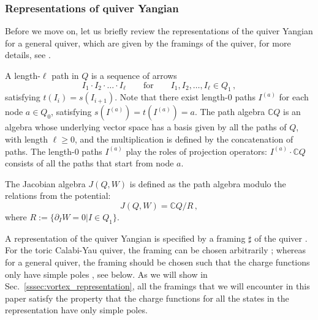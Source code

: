 \documentclass[12pt,a4paper]{article}
\newcounter{subsubsubsection}[subsubsection]
\renewcommand{\(}{\left(}
\renewcommand{\)}{\right)}
\renewcommand{\(}{\left(}
\renewcommand{\)}{\right)}
\begin{document}
\subsubsection{Representations of quiver Yangian}
\label{sssec:QY_rep}

Before we move on, let us briefly review the representations of the quiver Yangian for a general quiver, which are given by the framings of the quiver, for more details, 
see \cite{Li:2023zub}.


A length-$\ell$ path in $Q$ is a sequence of arrows
\begin{equation}\label{eq:path}
	I_1\cdot I_2\cdot\dots\cdot I_\ell\qquad \mathrm{for}\qquad  I_1,I_2,\dots,I_\ell\in Q_1\,,
\end{equation}
satisfying $t(I_i)=s(I_{i+1})$. 
Note that there exist length-$0$ paths $I^{(a)}$ for each node $a\in Q_0$, satisfying $s(I^{(a)})=t(I^{(a)})=a$.
The path algebra $\mathbb{C}Q$ is an algebra whose underlying vector space has a basis given by all the paths of $Q$, with length $\ell \geq 0$, and the multiplication is defined by the concatenation of paths. 
The length-$0$ paths $I^{(a)}$ play the roles of projection operators:  $I^{(a)}\cdot\mathbb{C}Q$ consists of all the paths that start from node $a$.

The Jacobian algebra $J(Q,W)$ is defined as the path algebra modulo the relations from the potential:
\begin{equation}
	J(Q,W)=\mathbb{C}Q/R\,,
\end{equation}
where $R:=\{\partial_I W=0| I\in Q_1\}$.


\label{ssssec:QY_rep_and_framing}

A representation of the quiver Yangian is specified by a framing $\sharp$ of the quiver \cite{Galakhov:2021xum,Li:2023zub}.
For the toric Calabi-Yau quiver, the framing can be chosen arbitrarily \cite{Galakhov:2021xum}; whereas for a general quiver, the framing should be chosen such that the charge functions only have simple poles \cite{Li:2023zub}, see below.
As we will show in Sec.~\ref{sssec:vortex_representation}, all the framings that we will encounter in this paper satisfy the property that the charge functions for all the states in the representation have only simple poles.
\end{document}
